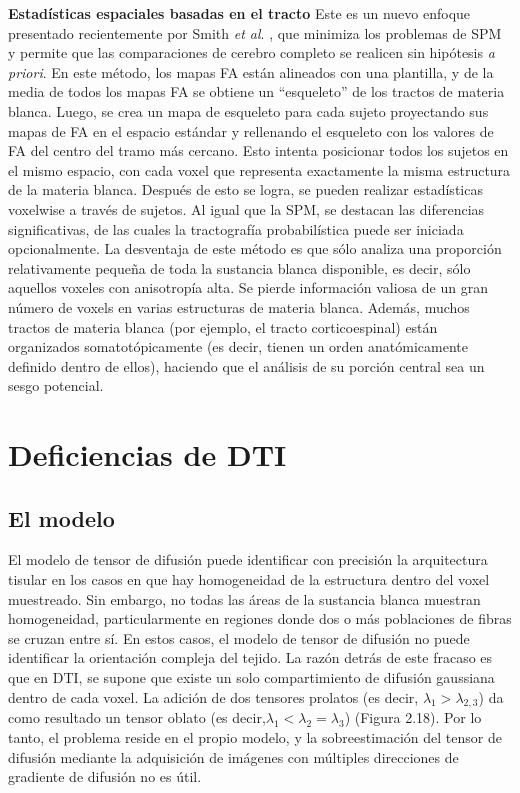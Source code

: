 \documentclass[12pt,a5,twoside]{book}
\begin{document}
\textbf{Estadísticas espaciales basadas en el tracto} Este es un nuevo enfoque presentado recientemente por Smith {\it et al}. \citep{Smith_2006}, que minimiza los problemas de SPM y permite que las comparaciones de cerebro completo se realicen sin hipótesis {\it a priori}. En este método, los mapas FA están alineados con una plantilla, y de la media de todos los mapas FA se obtiene un ``esqueleto'' de los tractos de materia blanca. Luego, se crea un mapa de esqueleto para cada sujeto proyectando sus mapas de FA en el espacio estándar y rellenando el esqueleto con los valores de FA del centro del tramo más cercano. Esto intenta posicionar todos los sujetos en el mismo espacio, con cada voxel que representa exactamente la misma estructura de la materia blanca. Después de esto se logra, se pueden realizar estadísticas voxelwise a través de sujetos. Al igual que la SPM, se destacan las diferencias significativas, de las cuales la tractografía probabilística puede ser iniciada opcionalmente. La desventaja de este método es que sólo analiza una proporción relativamente pequeña de toda la sustancia blanca disponible, es decir, sólo aquellos voxeles con anisotropía alta. Se pierde información valiosa de un gran número de voxels en varias estructuras de materia blanca. Además, muchos tractos de materia blanca (por ejemplo, el tracto corticoespinal) están organizados somatotópicamente (es decir, tienen un orden anatómicamente definido dentro de ellos), haciendo que el análisis de su porción central sea un sesgo potencial.

\section{Deficiencias de DTI}
\subsection{El modelo}

El modelo de tensor de difusión puede identificar con precisión la arquitectura tisular en los casos en que hay homogeneidad de la estructura dentro del voxel muestreado. Sin embargo, no todas las áreas de la sustancia blanca muestran homogeneidad, particularmente en regiones donde dos o más poblaciones de fibras se cruzan entre sí. En estos casos, el modelo de tensor de difusión no puede identificar la orientación compleja del tejido. La razón detrás de este fracaso es que en DTI, se supone que existe un solo compartimiento de difusión gaussiana dentro de cada voxel. La adición de dos tensores prolatos (es decir, $\lambda_{1} > \lambda_{2,3}$) da como resultado un tensor oblato (es decir,$\lambda_{1} < \lambda_{2} = \lambda_{3}$) (Figura 2.18). Por lo tanto, el problema reside en el propio modelo, y la sobreestimación del tensor de difusión mediante la adquisición de imágenes con múltiples direcciones de gradiente de difusión no es útil.
\end{document}
